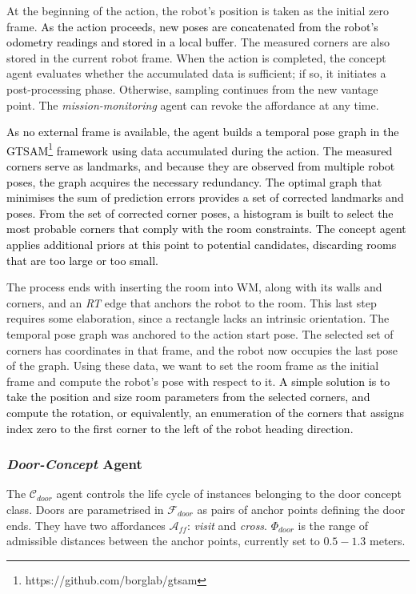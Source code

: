 \documentclass[10pt,a4paper]{article}
\begin{document}
At the beginning of the action, the robot's position is taken as the initial zero frame. \textcolor{black}{As the action proceeds, new poses are concatenated from the robot's odometry readings and stored in a local buffer}. The measured corners are also stored in the current robot frame.
When the action is completed, the concept agent evaluates whether the accumulated data is sufficient; if so, it initiates a post-processing phase. Otherwise, sampling continues from the new vantage point. The \textit{mission-monitoring} agent can revoke the affordance at any time. 



\textcolor{black}{As no external frame is available, the agent builds a temporal pose graph in the GTSAM\footnote{https://github.com/borglab/gtsam} framework using data accumulated during the action. The measured corners serve as landmarks, and because they are observed from multiple robot poses, the graph acquires the necessary redundancy. The optimal graph that minimises the sum of prediction errors provides a set of corrected landmarks and poses. From the set of corrected corner poses, a histogram is built to select the most probable corners that comply with the room constraints. The concept agent applies additional priors at this point to potential candidates, discarding rooms that are too large or too small. }

The process ends with inserting the room into WM, along with its walls and corners, and an \textit{RT} edge that anchors the robot to the room. This last step requires some elaboration, since a rectangle lacks an intrinsic orientation. The temporal pose graph was anchored to the action start pose. The selected set of corners has coordinates in that frame, and the robot now occupies the last pose of the graph. Using these data, we want to set the room frame as the initial frame and compute the robot's pose with respect to it. \textcolor{black}{A simple solution is to take the position and size room parameters from the selected corners, and compute the rotation, or equivalently, an enumeration of the corners that assigns index zero to the first corner to the left of the robot heading direction.}

\subsubsection{\textit{Door-Concept} Agent}

The $\mathcal{C}_{door}$ agent controls the life cycle of instances belonging to the door concept class. Doors are parametrised in $\mathcal{F}_{door}$ as pairs of anchor points defining the door ends. They have two affordances $\mathcal{A}_{ff}$: \textit{visit} and \textit{cross}. \( \Phi_{door} \) is the range of admissible distances between the anchor points, currently set to $0.5 - 1.3$ meters.
\end{document}
